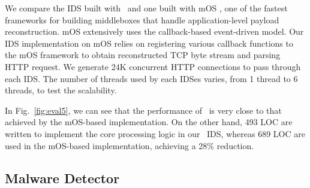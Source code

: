 

We compare the IDS built with \netstar~and one built with mOS \cite{201546}, one of the fastest frameworks for building middleboxes that handle application-level payload reconstruction. mOS extensively uses the callback-based event-driven model. Our IDS implementation on mOS relies on registering various callback functions to the mOS framework to obtain reconstructed TCP byte stream and parsing HTTP request.
We generate 24K concurrent HTTP connections to pass through each IDS. %
The number of threads used by each IDSes varies, from 1 thread to 6 threads, to test the scalability.

In Fig.~\ref{fig:eval5}, we can see that the performance of \netstar~is very close to that achieved by the mOS-based implementation. %
On the other hand, 493 LOC are written to implement the core processing logic in our \netstar~IDS, whereas 689 LOC are used in the mOS-based implementation, achieving a 28\% reduction.

\subsection {Malware Detector}
\label{sec:eval5}


